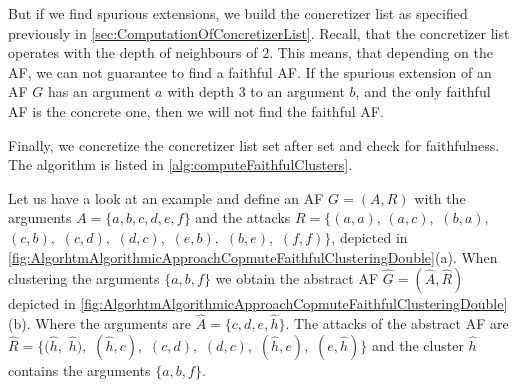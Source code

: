 But if we find spurious extensions, we build the concretizer list as specified previously in \cref{sec:ComputationOfConcretizerList}. Recall, that the concretizer list operates with the depth of neighbours of $2$. This means, that depending on the AF, we can not guarantee to find a faithful AF. If the spurious extension of an AF $G$ has an argument $a$ with depth 3 to an argument $b$, and the only faithful AF is the concrete one, then we will not find the faithful AF.

Finally, we concretize the concretizer list set after set and check for faithfulness. The algorithm is listed in \cref{alg:computeFaithfulClusters}.



\begin{example}
    Let us have a look at an example and define an AF $G=(A,R)$ with the arguments $A=\{a, b, c, d, e, f\}$ and the attacks $R=\bigl\{(a, a)$, $(a, c),$ $(b, a),$ $(c, b),$ $(c, d),$ $(d, c),$ $(e, b),$ $(b, e),$ $(f, f)\bigl\}$, depicted in \cref{fig:AlgorhtmAlgorithmicApproachCopmuteFaithfulClusteringDouble}(a). When clustering the arguments $\{a, b, f\}$ we obtain the abstract AF $\hat{G}=(\hat{A}, \hat{R})$ depicted in \cref{fig:AlgorhtmAlgorithmicApproachCopmuteFaithfulClusteringDouble}(b). Where the arguments are $\hat{A}=\{c, d, e, \hat{h}\}$. The attacks of the abstract AF are $\hat{R}=\{(\hat{h},$ $\hat{h}),$ $(\hat{h}, c),$ $(c, d),$ $(d, c),$ $(\hat{h}, e),$ $(e, \hat{h})\}$ and the cluster $\hat{h}$ contains the arguments $\{a, b, f\}$.
\end{example}

